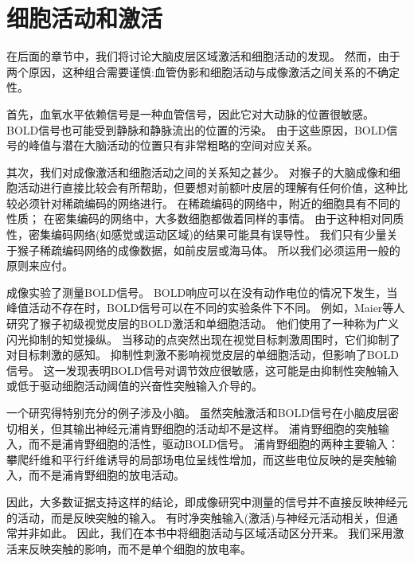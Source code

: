\section{细胞活动和激活}

在后面的章节中，我们将讨论大脑皮层区域激活和细胞活动的发现。
然而，由于两个原因，这种组合需要谨慎:血管伪影和细胞活动与成像激活之间关系的不确定性。

\par
首先，血氧水平依赖信号是一种血管信号，因此它对大动脉的位置很敏感。
BOLD信号也可能受到静脉和静脉流出的位置的污染\cite{turner2002much}。
由于这些原因，BOLD信号的峰值与潜在大脑活动的位置只有非常粗略的空间对应关系\cite{kim2004spatial}。


\par
其次，我们对成像激活和细胞活动之间的关系知之甚少。
对猴子的大脑成像和细胞活动进行直接比较会有所帮助，但要想对前额叶皮层的理解有任何价值，这种比较必须针对稀疏编码的网络进行。
在稀疏编码的网络中，附近的细胞具有不同的性质；
在密集编码的网络中，大多数细胞都做着同样的事情。
由于这种相对同质性，密集编码网络(如感觉或运动区域)的结果可能具有误导性。
我们只有少量关于猴子稀疏编码网络的成像数据，如前皮层或海马体\cite{nakahara2002functional,orban2004comparative}。
所以我们必须运用一般的原则来应付。


\par
成像实验了测量BOLD信号。
BOLD响应可以在没有动作电位的情况下发生\cite{logothetis2002neural}，当峰值活动不存在时，BOLD信号可以在不同的实验条件下不同。
例如，Maier等人\cite{maier2008divergence}研究了猴子初级视觉皮层的BOLD激活和单细胞活动。
他们使用了一种称为广义闪光抑制的知觉操纵。
当移动的点突然出现在视觉目标刺激周围时，它们抑制了对目标刺激的感知。
抑制性刺激不影响视觉皮层的单细胞活动，但影响了BOLD信号。
这一发现表明BOLD信号对调节效应很敏感\cite{logothetis2008we}，这可能是由抑制性突触输入或低于驱动细胞活动阈值的兴奋性突触输入介导的。


\par
一个研究得特别充分的例子涉及小脑。
虽然突触激活和BOLD信号在小脑皮层密切相关，但其输出神经元浦肯野细胞的活动却不是这样\cite{thomsen2004principal}。
浦肯野细胞的突触输入，而不是浦肯野细胞的活性，驱动BOLD信号\cite{gold2002neuronal}。
浦肯野细胞的两种主要输入：攀爬纤维\cite{offenhauser2005activity}和平行纤维\cite{thomsen2009principal}诱导的局部场电位呈线性增加，而这些电位反映的是突触输入，而不是浦肯野细胞的放电活动。


\par
因此，大多数证据支持这样的结论，即成像研究中测量的信号并不直接反映神经元的活动，而是反映突触的输入。
有时净突触输入(激活)与神经元活动相关，但通常并非如此。
因此，我们在本书中将细胞活动与区域活动区分开来。
我们采用激活来反映突触的影响，而不是单个细胞的放电率\cite{logothetis2002neural}。


